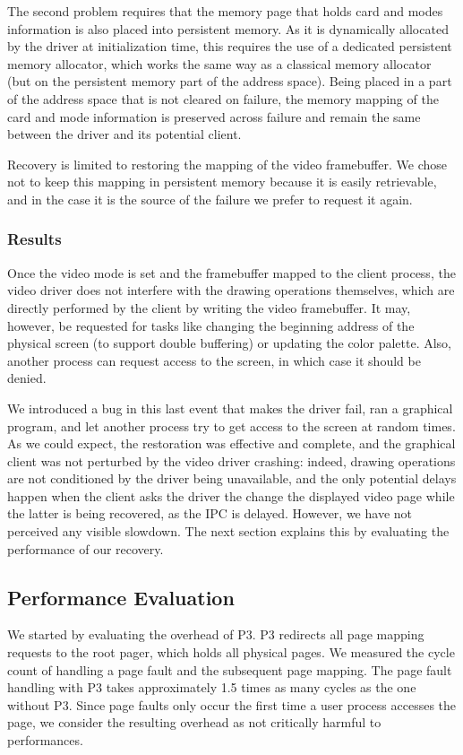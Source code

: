 \documentclass{acm_proc_article-sp}
\begin{document}
The second problem requires that the memory page that holds card and modes information is also placed into persistent memory. As it is dynamically allocated by the driver at initialization time, this requires the use of a dedicated persistent memory allocator, which works the same way as a classical memory allocator (but on the persistent memory part of the address space). Being placed in a part of the address space that is not cleared on failure, the memory mapping of the card and mode information is preserved across failure and remain the same between the driver and its potential client.

Recovery is limited to restoring the mapping of the video framebuffer. We chose not to keep this mapping in persistent memory because it is easily retrievable, and in the case it is the source of the failure we prefer to request it again.

\subsubsection{Results}
Once the video mode is set and the framebuffer mapped to the client process, the video driver does not interfere with the drawing operations themselves, which are directly performed by the client by writing the video framebuffer. It may, however, be requested for tasks like changing the beginning address of the physical screen (to support double buffering) or updating the color palette. Also, another process can request access to the screen, in which case it should be denied.

We introduced a bug in this last event that makes the driver fail, ran a graphical program, and let another process try to get access to the screen at random times. As we could expect, the restoration was effective and complete, and the graphical client was not perturbed by the video driver crashing: indeed, drawing operations are not conditioned by the driver being unavailable, and the only potential delays happen when the client asks the driver the change the displayed video page while the latter is being recovered, as the IPC is delayed. However, we have not perceived any visible slowdown. The next section explains this by evaluating the performance of our recovery.

\subsection{Performance Evaluation}
We started by evaluating the overhead of P3.  P3 redirects all page mapping requests to the root pager, which holds all physical pages.  We measured the cycle count of handling a page fault and the subsequent page mapping.  The page fault handling with P3 takes approximately 1.5 times as many cycles as the one without P3.  Since page faults only occur the first time a user process accesses the page, we consider the resulting overhead as not critically harmful to performances.
\end{document}
